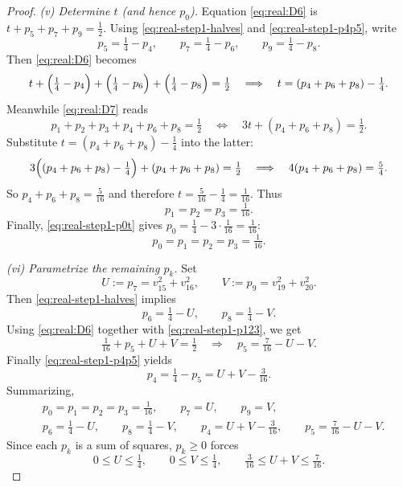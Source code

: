 \documentclass[11pt]{article}
\begin{document}
\begin{proof}
\smallskip
\noindent\emph{(v) Determine $t$ (and hence $p_0$).}
Equation \eqref{eq:real:D6} is $t+p_5+p_7+p_9=\tfrac12$.
Using \eqref{eq:real-step1-halves} and \eqref{eq:real-step1-p4p5}, write
\[
p_5=\tfrac14-p_4,\qquad p_7=\tfrac14-p_6,\qquad p_9=\tfrac14-p_8.
\]
Then \eqref{eq:real:D6} becomes
\[
t+\Bigl(\tfrac14-p_4\Bigr)+\Bigl(\tfrac14-p_6\Bigr)+\Bigl(\tfrac14-p_8\Bigr)=\tfrac12
\quad\Longrightarrow\quad
t=(p_4+p_6+p_8)-\tfrac14.
\]
Meanwhile \eqref{eq:real:D7} reads
\[
p_1+p_2+p_3+p_4+p_6+p_8=\tfrac12
\quad\Longleftrightarrow\quad
3t+(p_4+p_6+p_8)=\tfrac12.
\]
Substitute $t=(p_4+p_6+p_8)-\tfrac14$ into the latter:
\[
3\Bigl((p_4+p_6+p_8)-\tfrac14\Bigr)+(p_4+p_6+p_8)=\tfrac12
\quad\Longrightarrow\quad
4(p_4+p_6+p_8)=\tfrac54.
\]
So $p_4+p_6+p_8=\tfrac{5}{16}$ and therefore $t=\tfrac{5}{16}-\tfrac14=\tfrac{1}{16}$.
Thus
\begin{equation}
p_1=p_2=p_3=\tfrac{1}{16}.
\label{eq:real-step1-p123}
\end{equation}
Finally, \eqref{eq:real-step1-p0t} gives $p_0=\tfrac14-3\cdot \tfrac{1}{16}=\tfrac{1}{16}$:
\begin{equation}
p_0=p_1=p_2=p_3=\tfrac{1}{16}.
\label{eq:real-step1-fourfixed}
\end{equation}

\smallskip
\noindent\emph{(vi) Parametrize the remaining $p_k$.}
Set
\begin{equation}
U:=p_7=v_{15}^2+v_{16}^2,
\qquad
V:=p_9=v_{19}^2+v_{20}^2.
\label{eq:real-step1-UV}
\end{equation}
Then \eqref{eq:real-step1-halves} implies
\[
p_6=\tfrac14-U,\qquad p_8=\tfrac14-V.
\]
Using \eqref{eq:real:D6} together with \eqref{eq:real-step1-p123}, we get
\[
\tfrac{1}{16}+p_5+U+V=\tfrac12
\quad\Longrightarrow\quad
p_5=\tfrac{7}{16}-U-V.
\]
Finally \eqref{eq:real-step1-p4p5} yields
\[
p_4=\tfrac14-p_5=U+V-\tfrac{3}{16}.
\]
Summarizing,
\begin{equation}
\boxed{
\begin{aligned}
&p_0=p_1=p_2=p_3=\tfrac{1}{16},\qquad p_7=U,\qquad p_9=V,\\
&p_6=\tfrac14-U,\qquad p_8=\tfrac14-V,\qquad
p_4=U+V-\tfrac{3}{16},\qquad p_5=\tfrac{7}{16}-U-V.
\end{aligned}}
\label{eq:real-step1-param}
\end{equation}
Since each $p_k$ is a sum of squares, $p_k\ge 0$ forces
\begin{equation}
0\le U\le \tfrac14,\qquad 0\le V\le \tfrac14,\qquad \tfrac{3}{16}\le U+V\le \tfrac{7}{16}.
\label{eq:real-step1-constraints}
\end{equation}


\end{proof}
\end{document}
